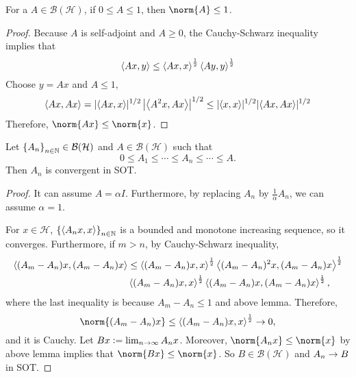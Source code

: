 \documentclass[a4paper,12pt]{article}
\begin{document}
\begin{lem}
    For a $A \in \mathcal{B}(\mathcal{H})$, if $0 \leq A \leq 1$, then $\norm{A} \leq 1$.
\end{lem}
\begin{proof}
    Because $A$ is self-adjoint and $A \geq 0$, the Cauchy-Schwarz inequality implies that
    \begin{equation*}
        \left\langle Ax,y \right\rangle \leq \left\langle Ax,x \right\rangle^{\frac{1}{2}}\left\langle Ay,y \right\rangle^{\frac{1}{2}}
    \end{equation*}
    Choose $y = Ax$ and $A \leq 1$,
    \begin{equation*}
        \left\langle Ax,Ax \right\rangle = |\langle A x, x\rangle|^{1 / 2}\left|\left\langle A^2 x, A x\right\rangle\right|^{1 / 2} \leq|\langle x, x\rangle|^{1 / 2}|\langle A x, A x\rangle|^{1 / 2}
    \end{equation*}
    Therefore, $\norm{Ax} \leq \norm{x}$.
\end{proof}

\begin{lem}
    Let $\left\{A_n\right\}_{n \in \mathbb{N}} \in \mathcal{B}(\mathcal{H})$ and $A \in \mathcal{B}(\mathcal{H})$ such that
    \begin{equation*}
        0 \leq A_1 \leq \cdots \leq A_n \leq \cdots \leq A.
    \end{equation*}
    Then $A_n$ is convergent in SOT.
\end{lem}
\begin{proof}
    It can assume $A = \alpha I$. Furthermore, by replacing $A_n$ by $\frac{1}{\alpha}A_n$, we can assume $\alpha = 1$.

    For $x \in \mathcal{H}$, $\left\{\left\langle A_nx,x \right\rangle\right\}_{n \in \mathbb{N}}$ is a bounded and monotone increasing sequence, so it converges. Furthermore, if $m > n$, by Cauchy-Schwarz inequality,
    \begin{equation*}
        \begin{aligned}
            \left\langle (A_m - A_n)x,(A_m - A_n)x \right\rangle &\leq \left\langle (A_m - A_n)x,x \right\rangle^{\frac{1}{2}}\left\langle (A_m - A_n)^2x,(A_m - A_n)x \right\rangle^{\frac{1}{2}} \\
            & \left\langle (A_m - A_n)x,x \right\rangle^{\frac{1}{2}}\left\langle (A_m - A_n)x,(A_m - A_n)x \right\rangle^{\frac{1}{2}},
        \end{aligned}
    \end{equation*}
    where the last inequality is because $A_m - A_n \leq 1$ and above lemma. Therefore,
    \begin{equation*}
        \norm{(A_m - A_n)x} \leq \inn{(A_m - A_n)x,x}^\frac{1}{2} \sto 0,
    \end{equation*}
    and it is Cauchy. Let $Bx \vcentcolon= \lim_{n \rightarrow \infty} A_nx$. Moreover, $\norm{A_nx} \leq \norm{x}$ by above lemma implies that $\norm{Bx} \leq \norm{x}$. So $B \in \mathcal{B}(\mathcal{H})$ and $A_n \rightarrow B$ in SOT.
\end{proof}
\end{document}

